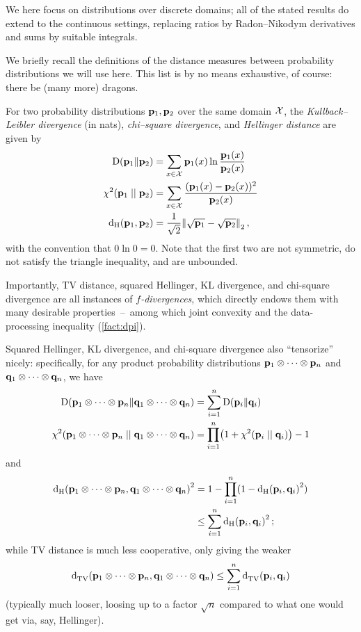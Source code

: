 We here focus on distributions over discrete domains; all of the stated results do extend to the continuous settings, replacing ratios by Radon--Nikodym derivatives and sums by suitable integrals.

We briefly recall the definitions of the distance measures between probability distributions we will use here. This list is by no means exhaustive, of course: there be (many more) dragons. 
\begin{definition}
For two probability distributions $\mathbf{p}_1,\mathbf{p}_2$ over the same domain $\mathcal{X}$, the \emph{Kullback--Leibler divergence} (in nats), \emph{chi--square divergence}, and \emph{Hellinger distance} are given by
\begin{align}
	\kldiv{\p_1}{\p_2} &= \sum_{x\in\domain} \p_1(x) \ln \frac{\p_1(x)}{\p_2(x)} \\
	\chisquare{\p_1}{\p_2} &= \sum_{x\in\domain} \frac{(\p_1(x)-\p_2(x))^2}{\p_2(x)} \\
	\hellinger{\p_1}{\p_2} %
	&= \frac{1}{\sqrt{2}}\normtwo{\sqrt{\p_1}-\sqrt{\p_2}}\,,
\end{align}
with the convention that $0\ln 0 = 0$. Note that the first two are not symmetric, do not satisfy the triangle inequality, and are unbounded.
\end{definition}

Importantly, TV distance, squared Hellinger, KL divergence, and chi-square divergence are all instances of \emph{$f$-divergences}, which directly endows them with many desirable properties~--~among which joint convexity and the data-processing inequality (\cref{fact:dpi}).

Squared Hellinger, KL divergence, and chi-square divergence also ``tensorize'' nicely: specifically, for any product probability distributions $\mathbf{p}_1\otimes\cdots\otimes\mathbf{p}_n$ and $\mathbf{q}_1\otimes\cdots\otimes\mathbf{q}_n$, we have
\begin{align}
\kldiv{\p_1\otimes\cdots\otimes\p_n}{\q_1\otimes\cdots\otimes\q_n} 
&= \sum_{i=1}^n \kldiv{\p_i}{\q_i} \\
\chisquare{\p_1\otimes\cdots\otimes\p_n}{\q_1\otimes\cdots\otimes\q_n} 
&= \prod_{i=1}^n \Paren{1+\chisquare{\p_i}{\q_i}} - 1
\end{align}
and
\begin{align}
\hellinger{\p_1\otimes\cdots\otimes\p_n}{\q_1\otimes\cdots\otimes\q_n}^2 
&= 1 - \prod_{i=1}^n (1-\hellinger{\p_i}{\q_i}^2) \notag\\
&\leq \sum_{i=1}^n \hellinger{\p_i}{\q_i}^2\,;
\end{align}
while TV distance is much less cooperative, only giving the weaker
\begin{equation}
\totalvardist{\p_1\otimes\cdots\otimes\p_n}{\q_1\otimes\cdots\otimes\q_n} \leq \sum_{i=1}^n \totalvardist{\p_i}{\q_i}
\end{equation}
(typically much looser, loosing up to a factor $\sqrt{n}$ compared to what one would get via, say, Hellinger).

